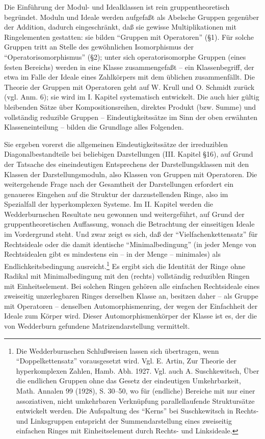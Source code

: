 \documentclass[11pt]{article}
\begin{document}
Die Einführung der Modul- und Idealklassen ist rein gruppentheoretisch begründet. Moduln und Ideale werden aufgefaßt als Abelsche Gruppen gegenüber der Addition, dadurch eingeschränkt, daß sie gewisse Multiplikationen mit Ringelementen gestatten: sie bilden ``Gruppen mit Operatoren'' (§1). Für solche Gruppen tritt an Stelle des gewöhnlichen Isomorphismus der ``Operatorisomorphismus'' (§2); unter sich operatorisomorphe Gruppen (eines festen Bereichs) werden in eine Klasse zusammengefaßt -- ein Klassenbegriff, der etwa im Falle der Ideale eines Zahlkörpers mit dem üblichen zusammenfällt. Die Theorie der Gruppen mit Operatoren geht auf W. Krull und O. Schmidt zurück (vgl. Anm. 6); sie wird im I. Kapitel systematisch entwickelt. Die auch hier gültig bleibenden Sätze über Kompositionsreihen, direktes Produkt (bzw. Summe) und vollständig reduzible Gruppen -- Eindeutigkeitssätze im Sinn der oben erwähnten Klasseneinteilung -- bilden die Grundlage alles Folgenden.

Sie ergeben vorerst die allgemeinen Eindeutigkeitssätze der irreduziblen Diagonalbestandteile bei beliebigen Darstellungen (III. Kapitel §16), auf Grund der Tatsache des eineindeutigen Entsprechens der Darstellungsklassen mit den Klassen der Darstellungsmoduln, also Klassen von Gruppen mit Operatoren. Die weitergehende Frage nach der Gesamtheit der Darstellungen erfordert ein genaueres Eingehen auf die Struktur der darzustellenden Ringe, also im Spezialfall der hyperkomplexen Systeme. Im II. Kapitel werden die Wedderburnschen Resultate neu gewonnen und weitergeführt, auf Grund der gruppentheoretischen Auffassung, wonach die Betrachtung der einseitigen Ideale im Vordergrund steht. Und zwar zeigt es sich, daß der ``Vielfachenkettensatz'' für Rechtsideale oder die damit identische ``Minimalbedingung'' (in jeder Menge von Rechtsidealen gibt es mindestens ein -- in der Menge -- minimales) als Endlichkeitsbedingung ausreicht.\footnote{Die Wedderburnschen Schlußweisen lassen sich übertragen, wenn ``Doppelkettensatz'' vorausgesetzt wird. Vgl. E. Artin, Zur Theorie der hyperkomplexen Zahlen, Hamb. Abh. 1927. Vgl. auch A. Suschkewitsch, Über die endlichen Gruppen ohne das Gesetz der eindeutigen Umkehrbarkeit, Math. Annalen 99 (1928), S. 30--50, wo für (endliche) Bereiche mit nur einer assoziativen, nicht umkehrbaren Verknüpfung parallellaufende Struktursätze entwickelt werden. Die Aufspaltung des ``Kerns'' bei Suschkewitsch in Rechts- und Linksgruppen entspricht der Summendarstellung eines zweiseitig einfachen Ringes mit Einheitselement durch Rechts- und Linksideale.} Es ergibt sich die Identität der Ringe ohne Radikal mit Minimalbedingung mit den (rechts) vollständig reduziblen Ringen mit Einheitselement. Bei solchen Ringen gehören alle einfachen Rechtsideale eines zweiseitig unzerlegbaren Ringes derselben Klasse an, besitzen daher -- als Gruppe mit Operatoren -- denselben Automorphismenring, der wegen der Einfachheit der Ideale zum Körper wird. Dieser Automorphismenkörper der Klasse ist es, der die von Wedderburn gefundene Matrizendarstellung vermittelt.
\end{document}

